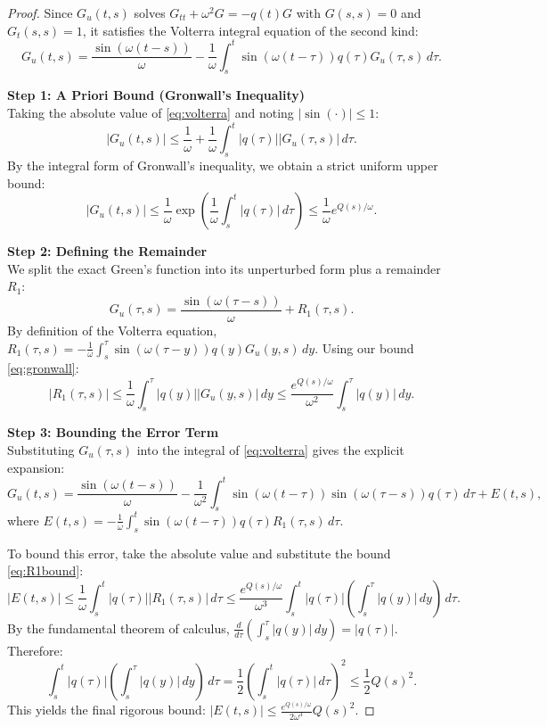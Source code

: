 \documentclass[10pt,reqno]{amsart}
\theoremstyle{definition}
\begin{document}
	\begin{proof}
		Since $G_u(t, s)$ solves $G_{tt} + \omega^2 G = -q(t)G$ with $G(s, s)=0$ and $G_t(s, s)=1$, it satisfies the Volterra integral equation of the second kind:
		\begin{equation} \label{eq:volterra}
			G_u(t, s) = \frac{\sin(\omega(t-s))}{\omega} - \frac{1}{\omega} \int_s^t \sin(\omega(t-\tau)) q(\tau) G_u(\tau, s) \, d\tau.
		\end{equation}
		
		\textbf{Step 1: A Priori Bound (Gronwall's Inequality)}\\
		Taking the absolute value of \eqref{eq:volterra} and noting $|\sin(\cdot)| \le 1$:
		\[ |G_u(t, s)| \le \frac{1}{\omega} + \frac{1}{\omega} \int_s^t |q(\tau)| |G_u(\tau, s)| \, d\tau. \]
		By the integral form of Gronwall's inequality, we obtain a strict uniform upper bound:
		\begin{equation} \label{eq:gronwall}
			|G_u(t, s)| \le \frac{1}{\omega} \exp\left( \frac{1}{\omega} \int_s^t |q(\tau)| \, d\tau \right) \le \frac{1}{\omega} e^{Q(s)/\omega}.
		\end{equation}
		
		\textbf{Step 2: Defining the Remainder}\\
		We split the exact Green's function into its unperturbed form plus a remainder $R_1$:
		\[ G_u(\tau, s) = \frac{\sin(\omega(\tau-s))}{\omega} + R_1(\tau, s). \]
		By definition of the Volterra equation, $R_1(\tau, s) = - \frac{1}{\omega} \int_s^\tau \sin(\omega(\tau-y)) q(y) G_u(y, s) \, dy$.
		Using our bound \eqref{eq:gronwall}:
		\begin{equation} \label{eq:R1bound}
			|R_1(\tau, s)| \le \frac{1}{\omega} \int_s^\tau |q(y)| |G_u(y, s)| \, dy \le \frac{e^{Q(s)/\omega}}{\omega^2} \int_s^\tau |q(y)| \, dy.
		\end{equation}
		
		\textbf{Step 3: Bounding the Error Term}\\
		Substituting $G_u(\tau, s)$ into the integral of \eqref{eq:volterra} gives the explicit expansion:
		\[ G_u(t, s) = \frac{\sin(\omega(t-s))}{\omega} - \frac{1}{\omega^2} \int_s^t \sin(\omega(t-\tau)) \sin(\omega(\tau-s)) q(\tau) \, d\tau + E(t, s), \]
		where $E(t, s) = - \frac{1}{\omega} \int_s^t \sin(\omega(t-\tau)) q(\tau) R_1(\tau, s) \, d\tau$.
		
		To bound this error, take the absolute value and substitute the bound \eqref{eq:R1bound}:
		\[ |E(t, s)| \le \frac{1}{\omega} \int_s^t |q(\tau)| |R_1(\tau, s)| \, d\tau \le \frac{e^{Q(s)/\omega}}{\omega^3} \int_s^t |q(\tau)| \left( \int_s^\tau |q(y)| \, dy \right) \, d\tau. \]
		By the fundamental theorem of calculus, $\frac{d}{d\tau} \left( \int_s^\tau |q(y)| \, dy \right) = |q(\tau)|$. Therefore:
		\[ \int_s^t |q(\tau)| \left( \int_s^\tau |q(y)| \, dy \right) \, d\tau = \frac{1}{2} \left( \int_s^t |q(\tau)| \, d\tau \right)^2 \le \frac{1}{2} Q(s)^2. \]
		This yields the final rigorous bound: $|E(t, s)| \le \frac{e^{Q(s)/\omega}}{2\omega^3} Q(s)^2$. 
	\end{proof}
	
\end{document}
